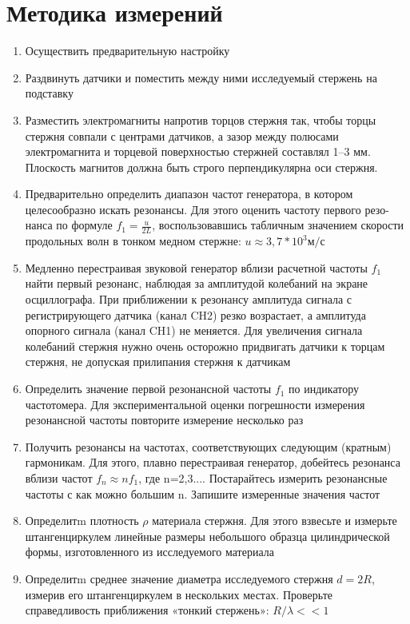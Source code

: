 \documentclass[a4paper]{article}
\begin{document}
\section{Методика измерений}
\begin{enumerate}
\item Осуществить предварительную настройку
\item Раздвинуть датчики и поместить между ними исследуемый стержень
на подставку
\item Разместить электромагниты напротив торцов стержня так, чтобы
торцы стержня совпали с центрами датчиков, а зазор между полюсами электромагнита и торцевой поверхностью стержней составлял 1–3 мм. Плоскость магнитов должна быть строго перпендикулярна оси стержня.
\item Предварительно определить диапазон частот генератора, в котором
целесообразно искать резонансы. Для этого оценить частоту первого резо-
нанса по формуле $f_1=\frac{u}{2L}$, воспользовавшись табличным значением скорости продольных волн в тонком медном стержне: $u\approx 3,7*10^3 м/с$
\item Медленно перестраивая звуковой генератор вблизи расчетной частоты $f_1$ найти первый резонанс, наблюдая за амплитудой колебаний на
экране осциллографа. При приближении к резонансу амплитуда сигнала с
регистрирующего датчика (канал CH2) резко возрастает, а амплитуда опорного сигнала (канал CH1) не меняется. Для увеличения сигнала колебаний
стержня нужно очень осторожно придвигать датчики к торцам стержня, не
допуская прилипания стержня к датчикам
\item Определить значение первой резонансной частоты $f_1$ по индикатору
частотомера. Для экспериментальной оценки погрешности измерения резонансной частоты повторите измерение несколько раз
\item Получить резонансы на частотах, соответствующих следующим
(кратным) гармоникам. Для этого, плавно перестраивая генератор, добейтесь резонанса вблизи частот $f_n\approx nf_1$, где n=2,3.... Постарайтесь измерить резонансные частоты с как можно большим n. Запишите измеренные
значения частот
\item Определитm плотность $\rho$ материала стержня. Для этого взвесьте и измерьте штангенциркулем линейные размеры небольшого образца цилиндрической формы, изготовленного из исследуемого материала
\item Определитm среднее значение диаметра исследуемого стержня
$d=2R$, измерив его штангенциркулем в нескольких местах. Проверьте
справедливость приближения «тонкий стержень»: $R/ \lambda << 1$

\end{enumerate}
\end{document}
